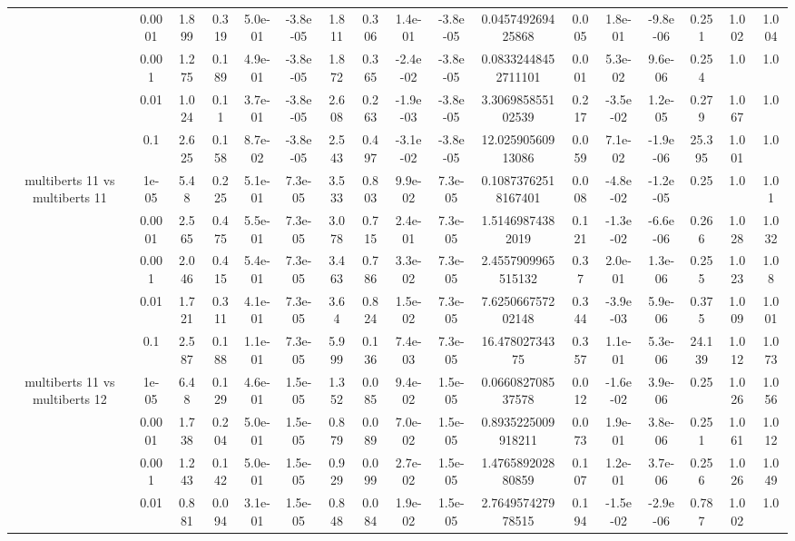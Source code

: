 \begin{tabular}{|c|c|c|c|c|c|c|c|c|c|c|c|c|c|c|c|c|}
 & 0.0001 & 1.899 & 0.319 & 5.0e-01 & -3.8e-05 & 1.811 & 0.306 & 1.4e-01 & -3.8e-05 & 0.045749269425868 & 0.005 & 1.8e-01 & -9.8e-06 & 0.251 & 1.002 & 1.004 \\
 & 0.001 & 1.275 & 0.189 & 4.9e-01 & -3.8e-05 & 1.872 & 0.365 & -2.4e-02 & -3.8e-05 & 0.08332448452711101 & 0.001 & 5.3e-02 & 9.6e-06 & 0.254 & 1.0 & 1.0 \\
 & 0.01 & 1.024 & 0.11 & 3.7e-01 & -3.8e-05 & 2.608 & 0.263 & -1.9e-03 & -3.8e-05 & 3.306985855102539 & 0.217 & -3.5e-02 & 1.2e-05 & 0.279 & 1.067 & 1.0 \\
 & 0.1 & 2.625 & 0.158 & 8.7e-02 & -3.8e-05 & 2.543 & 0.497 & -3.1e-02 & -3.8e-05 & 12.02590560913086 & 0.059 & 7.1e-02 & -1.9e-06 & 25.395 & 1.001 & 1.0 \\
\hline
\multirow{5}{*}{multiberts 11 vs multiberts 11} & 1e-05 & 5.48 & 0.225 & 5.1e-01 & 7.3e-05 & 3.533 & 0.803 & 9.9e-02 & 7.3e-05 & 0.10873762518167401 & 0.008 & -4.8e-02 & -1.2e-05 & 0.25 & 1.0 & 1.01 \\
 & 0.0001 & 2.565 & 0.475 & 5.5e-01 & 7.3e-05 & 3.078 & 0.715 & 2.4e-01 & 7.3e-05 & 1.51469874382019 & 0.121 & -1.3e-02 & -6.6e-06 & 0.266 & 1.028 & 1.032 \\
 & 0.001 & 2.046 & 0.415 & 5.4e-01 & 7.3e-05 & 3.463 & 0.786 & 3.3e-02 & 7.3e-05 & 2.4557909965515132 & 0.37 & 2.0e-01 & 1.3e-06 & 0.255 & 1.023 & 1.08 \\
 & 0.01 & 1.721 & 0.311 & 4.1e-01 & 7.3e-05 & 3.64 & 0.824 & 1.5e-02 & 7.3e-05 & 7.625066757202148 & 0.344 & -3.9e-03 & 5.9e-06 & 0.375 & 1.009 & 1.001 \\
 & 0.1 & 2.587 & 0.188 & 1.1e-01 & 7.3e-05 & 5.999 & 0.136 & 7.4e-03 & 7.3e-05 & 16.47802734375 & 0.357 & 1.1e-01 & 5.3e-06 & 24.139 & 1.012 & 1.073 \\
\hline
\multirow{5}{*}{multiberts 11 vs multiberts 12} & 1e-05 & 6.48 & 0.129 & 4.6e-01 & 1.5e-05 & 1.352 & 0.085 & 9.4e-02 & 1.5e-05 & 0.066082708537578 & 0.012 & -1.6e-02 & 3.9e-06 & 0.25 & 1.026 & 1.056 \\
 & 0.0001 & 1.738 & 0.204 & 5.0e-01 & 1.5e-05 & 0.879 & 0.089 & 7.0e-02 & 1.5e-05 & 0.8935225009918211 & 0.073 & 1.9e-01 & 3.8e-06 & 0.251 & 1.061 & 1.012 \\
 & 0.001 & 1.243 & 0.142 & 5.0e-01 & 1.5e-05 & 0.929 & 0.099 & 2.7e-02 & 1.5e-05 & 1.476589202880859 & 0.107 & 1.2e-01 & 3.7e-06 & 0.256 & 1.026 & 1.049 \\
 & 0.01 & 0.881 & 0.094 & 3.1e-01 & 1.5e-05 & 0.848 & 0.084 & 1.9e-02 & 1.5e-05 & 2.764957427978515 & 0.194 & -1.5e-02 & -2.9e-06 & 0.787 & 1.002 & 1.0 \\

\end{tabular}
